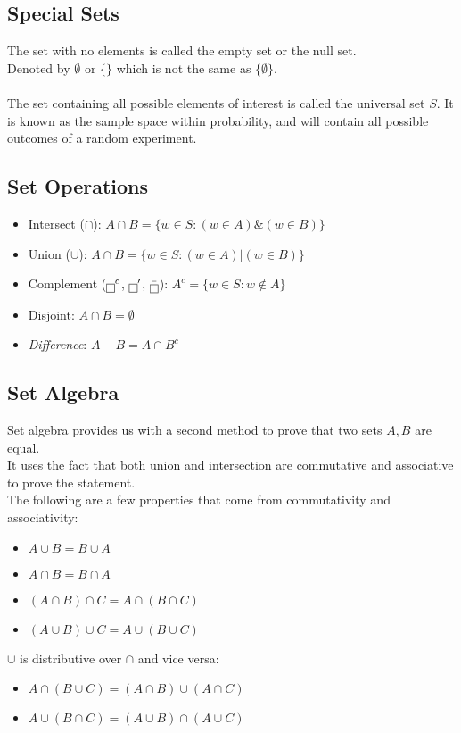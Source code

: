 \documentclass[nobib]{tufte-handout}
\begin{document}
\subsection{Special Sets}
The set with no elements is called the empty set or the null set.\\
Denoted by $\emptyset \text{ or } \{\}$ which is not the same as $\{\emptyset\}$.\\~\\
The set containing all possible elements of interest is called the universal set $S$. It is known as the sample space within probability, and will contain all possible outcomes of a random experiment.\\
\subsection{Set Operations}
\begin{itemize}
    \item Intersect ($\cap$): $A\cap B = \{w \in S: (w \in A) \& (w \in B) \}$
    \item Union ($\cup$): $A\cap B = \{w \in S: (w \in A) | (w\in B)\}$
    \item Complement ($\fbox{\phantom{}}^c$, $\fbox{\phantom{}}'$, $\bar{\fbox{\phantom{}}}$): $A^c = \{w \in S: w \not \in A\}$
    \item Disjoint: $A\cap B = \emptyset$
    \item \textit{Difference}: $A-B = A\cap B^c$
\end{itemize}
\subsection{Set Algebra}
Set algebra provides us with a second method to prove that two sets $A,B$ are equal.\\
It uses the fact that both union and intersection are commutative and associative to prove the statement.\\
The following are a few properties that come from commutativity and associativity:
\begin{itemize}
    \item $A\cup B = B\cup A$
    \item $A\cap B = B\cap A$
    \item $(A\cap B)\cap C = A \cap(B\cap C)$
    \item $(A\cup B)\cup C = A \cup(B\cup C)$
\end{itemize}
$\cup$ is distributive over $\cap$ and vice versa:
\begin{itemize}
    \item $A \cap (B\cup C) = (A\cap B) \cup (A\cap C)$
    \item $A \cup (B\cap C) = (A\cup B) \cap (A\cup C)$
\end{itemize}
\end{document}
